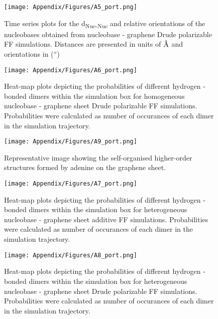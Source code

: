\begin{figure}
    \centering
    \texttt{[image: Appendix/Figures/A5\_port.png]}
    \caption[Time series plots for the d\textsubscript{Nuc-Graph} and relative orientations of the nucleobases obtained from nucleobase - graphene Drude polarizable FF simulations]{Time series plots for the d\textsubscript{Nuc-Nuc} and relative orientations of the nucleobases obtained from nucleobase - graphene Drude polarizable FF simulations. Distances are presented in units of $\text{\normalfont\AA}$ and orientations in ($\degree$)}
\end{figure}

\begin{figure}
    \centering
    \texttt{[image: Appendix/Figures/A6\_port.png]}
    \caption[Heat-map plots depicting the probabilities of different hydrogen - bonded dimers within the simulation box for homogeneous nucleobase - graphene sheet Drude polarizable FF simulations]{Heat-map plots depicting the probabilities of different hydrogen - bonded dimers within the simulation box for homogeneous nucleobase - graphene sheet Drude polarizable FF simulations. Probabilities were calculated as number of occurances of each dimer in the simulation trajectory.}
\end{figure}

\begin{figure}
    \centering
    \texttt{[image: Appendix/Figures/A9\_port.png]}
    \caption[Representative image showing the self-organised higher-order structures formed by adenine on the graphene sheet]{Representative image showing the self-organised higher-order structures formed by adenine on the graphene sheet.}
\end{figure}

\begin{figure}
    \centering
    \texttt{[image: Appendix/Figures/A7\_port.png]}
    \caption[Heat-map plots depicting the probabilities of different hydrogen - bonded dimers within the simulation box for heterogeneous nucleobase - graphene sheet additive FF simulations]{Heat-map plots depicting the probabilities of different hydrogen - bonded dimers within the simulation box for heterogeneous nucleobase - graphene sheet additive FF simulations. Probabilities were calculated as number of occurances of each dimer in the simulation trajectory.}
\end{figure}

\begin{figure}
    \centering
    \texttt{[image: Appendix/Figures/A8\_port.png]}
    \caption[Heat-map plots depicting the probabilities of different hydrogen - bonded dimers within the simulation box for heterogeneous nucleobase - graphene sheet Drude polarizable FF simulations]{Heat-map plots depicting the probabilities of different hydrogen - bonded dimers within the simulation box for heterogeneous nucleobase - graphene sheet Drude polarizable FF simulations. Probabilities were calculated as number of occurances of each dimer in the simulation trajectory.}
\end{figure}